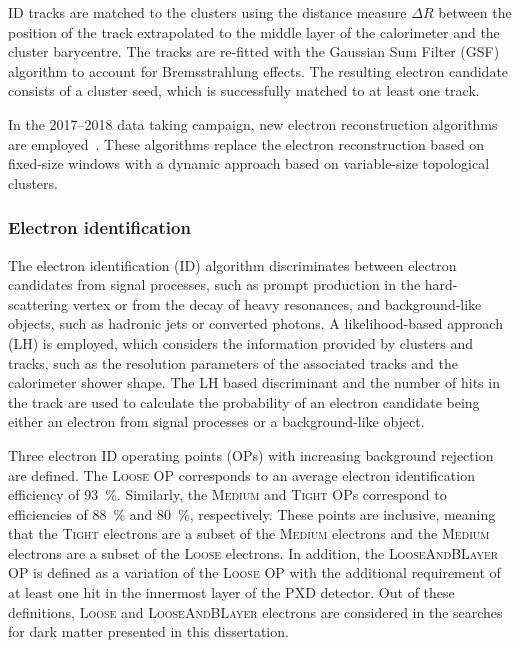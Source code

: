 ID tracks are matched to the clusters using the distance measure \(\Delta R\) between the position of the track extrapolated to the middle layer of the calorimeter and the cluster barycentre. The tracks are re-fitted with the Gaussian Sum Filter (GSF)~\cite{ATLAS-CONF-2012-047} algorithm to account for Bremsstrahlung effects. The resulting electron candidate consists of a cluster seed, which is successfully matched to at least one track.

In the 2017--2018 data taking campaign, new electron reconstruction algorithms are employed~\cite{ATL-PHYS-PUB-2017-022,EGAM-2018-01}. These algorithms replace the electron reconstruction based on fixed-size windows with a dynamic approach based on variable-size topological clusters.

\subsubsection{Electron identification}
The electron identification (ID) algorithm discriminates between electron candidates from signal processes, such as prompt production in the hard-scattering vertex or from the decay of heavy resonances, and background-like objects, such as hadronic jets or converted photons. A likelihood-based approach (LH) is employed, which considers the information provided by clusters and tracks, such as the resolution parameters of the associated tracks and the calorimeter shower shape. The LH based discriminant and the number of hits in the track are used to calculate the probability of an electron candidate being either an electron from signal processes or a background-like object.

Three electron ID operating points (OPs) with increasing background rejection are defined.
The \textsc{Loose} OP corresponds to an average electron identification efficiency of \SI{93}{\percent}.
Similarly, the \textsc{Medium} and \textsc{Tight} OPs correspond to efficiencies of \SI{88}{\percent} and \SI{80}{\percent}, respectively.
These points are inclusive, meaning that the \textsc{Tight} electrons are a subset of the \textsc{Medium} electrons and the \textsc{Medium} electrons are a subset of the \textsc{Loose} electrons. In addition, the \textsc{LooseAndBLayer} OP is defined as a variation of the \textsc{Loose} OP with the additional requirement of at least one hit in the innermost layer of the PXD detector.
Out of these definitions, \textsc{Loose} and \textsc{LooseAndBLayer} electrons are considered in the searches for dark matter presented in this dissertation.

